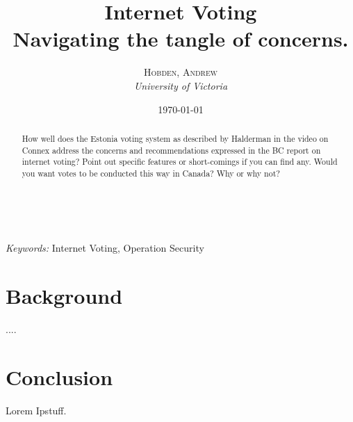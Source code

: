 \documentclass[a4paper, 11pt]{article} %
\title{
    \textbf{Internet Voting}\\ %
    Navigating the tangle of concerns.
} %
\author{\textsc{Hobden, Andrew} %
\\{\textit{University of Victoria}}} %
\date{\today} %
\makeatletter
\renewcommand{\maketitle}{ %
\begin{flushright} %
{\LARGE\@title} %

\vspace{50pt} %

{\large\@author} %
\\\@date %

\vspace{40pt} %
\end{flushright}
}
\makeatother
\begin{document}
\maketitle %



\begin{abstract}
    How well does the Estonia voting system as described by Halderman in the video on Connex address the concerns and recommendations expressed in the BC report on internet voting?  Point out specific features or short-comings if you can find any. Would you want votes to be conducted this way in Canada? Why or why not?
\end{abstract}

\hspace*{3,6mm}\textit{Keywords:} Internet Voting, Operation Security %

\vspace{30pt} %


\section*{Background}



\begin{displayquote}
....
\end{displayquote}

\section*{Conclusion}
Lorem Ipstuff.







\end{document}
